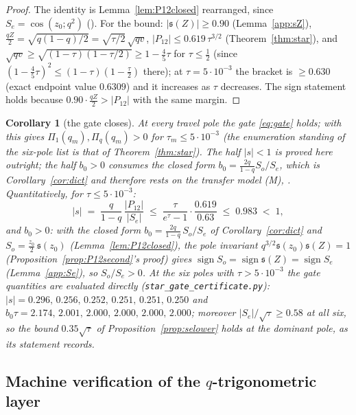 \documentclass[11pt]{article}
\theoremstyle{plain}
\newtheorem{corollary}[theorem]{Corollary}
\theoremstyle{definition}
\theoremstyle{remark}
\begin{document}
\begin{proof}
The identity is Lemma~\ref{lem:P12closed} rearranged, since $S_e=\cos(z_0;q^2)$
({\cite[Proposition \textup{prop:qtrig}]{Bonfioli2026bA}}). For the bound: $|\mathfrak s(Z)|\ge0.90$ (Lemma~\ref{app:sZ}),
$\tfrac{qZ}2=\sqrt{q(1-q)/2}=\sqrt{\tau/2}\,\sqrt{qv}$, $|P_{12}|\le0.619\,\tau^{3/2}$
(Theorem~\ref{thm:star}), and $\sqrt{qv}\ge\sqrt{(1-\tau)(1-\tau/2)}\ge1-\tfrac45\tau$ for
$\tau\le\tfrac12$ (since $(1-\tfrac45\tau)^2\le(1-\tau)(1-\tfrac\tau2)$ there); at
$\tau=5\cdot10^{-3}$ the bracket is $\ge0.630$ (exact endpoint value $0.6309$) and it increases as
$\tau$ decreases. The sign
statement holds because $0.90\cdot\tfrac{qZ}2>|P_{12}|$ with the same margin.
\end{proof}

\begin{corollary}[the gate closes]\label{app:gate}
At every travel pole the gate \eqref{eq:gate} holds; with {\cite[Theorem ``closed form of the junction pairing'', \textup{thm:RJ}]{Bonfioli2026bA}} this gives
$\Pi_1(q_m),\Pi_q(q_m)>0$ for $\tau_m\le5\cdot10^{-3}$ (the enumeration
standing of the six-pole list is that of Theorem~\ref{thm:star}). The half $|s|<1$ is proved here
outright; the half $b_0>0$ consumes the closed form $b_0=\tfrac{2q}{1-q}S_o/S_e$, which is
Corollary~\ref{cor:dict} and therefore rests on the transfer model \textup{(M)},
{\cite[Theorem ``the transfer model \textup{(M)}'', \textup{thm:model}]{Bonfioli2026bA}}. Quantitatively,
for $\tau\le5\cdot10^{-3}$:
\[
 |s|\;=\;\frac{q}{1-q}\,\frac{|P_{12}|}{|S_e|}\;\le\;\frac{\tau}{e^\tau-1}\cdot\frac{0.619}{0.63}
 \;\le\;0.983\;<\;1,
\]
and $b_0>0$: with the closed form $b_0=\tfrac{2q}{1-q}\,S_o/S_e$ of Corollary~\ref{cor:dict} and
$S_o=\tfrac{z_0}2\,\mathfrak s(z_0)$ (Lemma~\ref{lem:P12closed}), the pole invariant
$q^{3/2}\mathfrak s(z_0)\mathfrak s(Z)=1$ (Proposition~\ref{prop:P12second}'s proof) gives
$\operatorname{sign}S_o=\operatorname{sign}\mathfrak s(Z)=\operatorname{sign}S_e$
(Lemma~\ref{app:Se}), so $S_o/S_e>0$. At the six poles with $\tau>5\cdot10^{-3}$ the gate
quantities are evaluated directly (\texttt{star\_gate\_certificate.py}):
$|s|=0.296,\,0.256,\,0.252,\,0.251,\,0.251,\,0.250$ and
$b_0\tau=2.174,\,2.001,\,2.000,\,2.000,\,2.000,\,2.000$; moreover $|S_e|/\sqrt\tau\ge0.58$ at
all six, so the bound $0.35\sqrt\tau$ of Proposition~\ref{prop:selower} holds at the dominant pole,
as its statement records.
\end{corollary}

\subsection*{Machine verification of the $q$-trigonometric layer}
\end{document}
